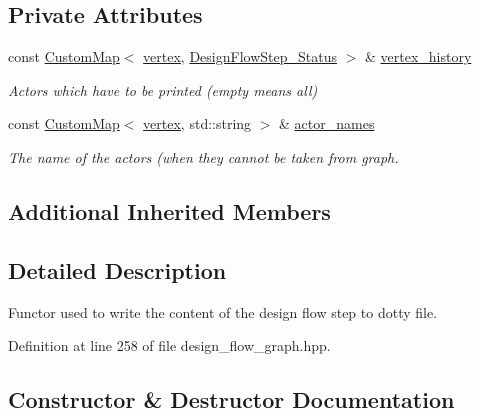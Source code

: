 \subsection*{Private Attributes}
\begin{DoxyCompactItemize}
\item 
const \hyperlink{custom__map_8hpp_a18ca01763abbe3e5623223bfe5aaac6b}{Custom\+Map}$<$ \hyperlink{graph_8hpp_abefdcf0544e601805af44eca032cca14}{vertex}, \hyperlink{design__flow__step_8hpp_afb1f0d73069c26076b8d31dbc8ebecdf}{Design\+Flow\+Step\+\_\+\+Status} $>$ \& \hyperlink{classDesignFlowStepWriter_af972e0108493754493763d0451405483}{vertex\+\_\+history}
\begin{DoxyCompactList}\small\item\em Actors which have to be printed (empty means all) \end{DoxyCompactList}\item 
const \hyperlink{custom__map_8hpp_a18ca01763abbe3e5623223bfe5aaac6b}{Custom\+Map}$<$ \hyperlink{graph_8hpp_abefdcf0544e601805af44eca032cca14}{vertex}, std\+::string $>$ \& \hyperlink{classDesignFlowStepWriter_a4e5109313c00181d72cb6a260340bfc9}{actor\+\_\+names}
\begin{DoxyCompactList}\small\item\em The name of the actors (when they cannot be taken from graph. \end{DoxyCompactList}\end{DoxyCompactItemize}
\subsection*{Additional Inherited Members}


\subsection{Detailed Description}
Functor used to write the content of the design flow step to dotty file. 

Definition at line 258 of file design\+\_\+flow\+\_\+graph.\+hpp.



\subsection{Constructor \& Destructor Documentation}
\mbox{\label{classDesignFlowStepWriter_a294213703960582d00bfde4210650605}} 
